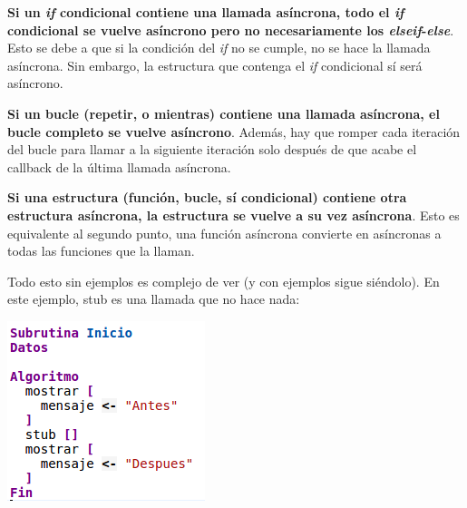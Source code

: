 \documentclass{report}
\begin{document}
	\vspace{10px}
	\noindent
	\textbf{Si un \textit{if} condicional contiene una llamada asíncrona, todo el \textit{if} condicional se vuelve asíncrono pero no necesariamente los \textit{elseif}-\textit{else}}. Esto se debe a que si la condición del \textit{if} no se cumple, no se hace la llamada asíncrona. Sin embargo, la estructura que contenga el \textit{if} condicional sí será asíncrono. 
	
	\vspace{10px}
	\noindent
	\textbf{Si un bucle (repetir, o mientras) contiene una llamada asíncrona, el bucle completo se vuelve asíncrono}. Además, hay que romper cada iteración del bucle para llamar a la siguiente iteración solo después de que acabe el callback de la última llamada asíncrona.
	
	\vspace{10px}
	\noindent
	\textbf{Si una estructura (función, bucle, sí condicional) contiene otra estructura asíncrona, la estructura se vuelve a su vez asíncrona}. Esto es equivalente al segundo punto, una función asíncrona convierte en asíncronas a todas las funciones que la llaman.
	
	Todo esto sin ejemplos es complejo de ver (y con ejemplos sigue siéndolo). En este ejemplo, stub es una llamada que no hace nada:
	
	\begin{center}
	\includegraphics{asincrono}
	\end{center}
\end{document}
